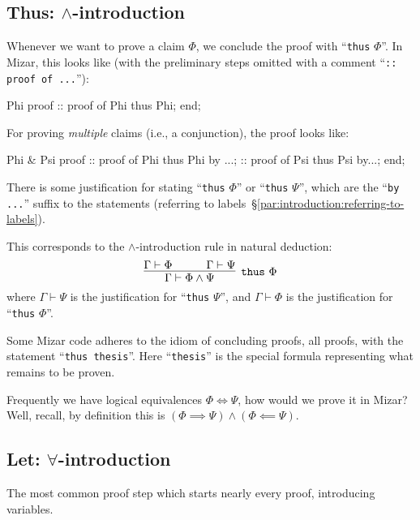 \subsection{Thus: $\land$-introduction}
Whenever we want to prove a claim $\Phi$, we conclude the proof with
``\texttt{thus} $\Phi$''. In Mizar, this looks like (with the
preliminary steps omitted with a comment ``\verb#:: proof of ...#''):

\begin{mizar}
Phi
proof
  :: proof of Phi
  thus Phi;
end;
\end{mizar}

For proving \emph{multiple} claims (i.e., a conjunction), the proof
looks like:

\begin{mizar}
Phi & Psi
proof
  :: proof of Phi
  thus Phi by ...;
  :: proof of Psi
  thus Psi by...;
end;
\end{mizar}
There is some justification for stating ``\verb#thus# $\Phi$'' or
``\verb#thus# $\Psi$'', which are the ``\verb#by ...#'' suffix to the
statements (referring to labels~\S\ref{par:introduction:referring-to-labels}).

This corresponds to the $\land$-introduction rule in natural deduction:
\begin{equation}
  \vcenter{\infer[\mathtt{thus}~\Phi]{\Gamma\vdash\Phi\land\Psi}{
    \Gamma\vdash\Phi &\qquad \Gamma\vdash\Psi}}
\end{equation}
where $\Gamma\vdash\Psi$ is the justification for ``\verb#thus# $\Psi$'',
and $\Gamma\vdash\Phi$ is the justification for ``\verb#thus# $\Phi$''.

\begin{idiom}
Some Mizar code adheres to the idiom of concluding proofs, all proofs,
with the statement ``\verb#thus thesis#''. Here ``\verb#thesis#'' is the
special formula representing what remains to be proven.
\end{idiom}

\begin{exercise}
Frequently we have logical equivalences $\Phi\iff\Psi$, how would we
prove it in Mizar? Well, recall, by definition this is
$(\Phi\implies\Psi)\land(\Phi\impliedby\Psi)$.
\end{exercise}

\subsection{Let: $\forall$-introduction}
The most common proof step which starts nearly every proof, introducing
variables.

